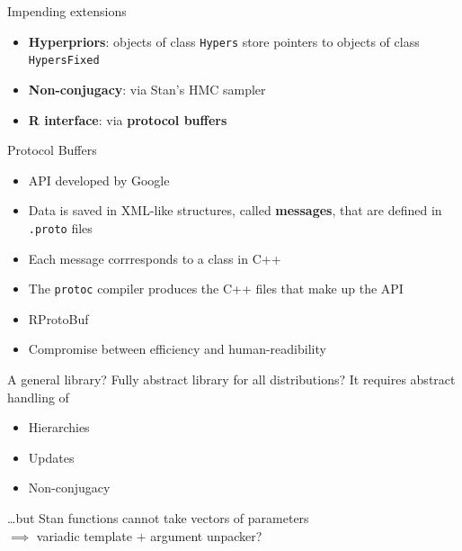 \begin{frame}{Impending extensions}
	\begin{itemize}
	   \item \textbf{Hyperpriors}: objects of class \texttt{Hypers} store pointers to objects of class \texttt{HypersFixed}
	   \item \textbf{Non-conjugacy}: via Stan's HMC sampler
	   \item  \textbf{R interface}: via \textbf{protocol buffers}
	\end{itemize}
\end{frame}

\begin{frame}{Protocol Buffers}
	\begin{itemize}
		\item API developed by Google
		\item Data is saved in XML-like structures, called \textbf{messages}, that are defined in \texttt{.proto} files
		\item Each message corrresponds to a class in C++
		\item The \texttt{protoc} compiler produces the C++ files that make up the API
		\item RProtoBuf
		\item Compromise between efficiency and human-readibility
	\end{itemize}
\end{frame}

\begin{frame}{A general library?}
	Fully abstract library for all distributions? It requires abstract handling of
	\begin{itemize}
		\item Hierarchies
		\item Updates
		\item Non-conjugacy
	\end{itemize}
	\vspace{10pt}
	\dots but Stan functions cannot take vectors of parameters \\
	$\implies$ variadic template $+$ argument unpacker?
\end{frame}


